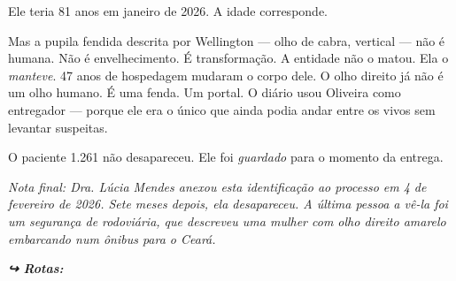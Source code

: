 \noindent Ele teria 81 anos em janeiro de 2026. A idade corresponde.

\noindent Mas a pupila fendida descrita por Wellington --- olho de cabra, vertical --- não é humana. Não é envelhecimento. É transformação. A entidade não o matou. Ela o \textit{manteve}. 47 anos de hospedagem mudaram o corpo dele. O olho direito já não é um olho humano. É uma fenda. Um portal. O diário usou Oliveira como entregador --- porque ele era o único que ainda podia andar entre os vivos sem levantar suspeitas.

\noindent O paciente 1.261 não desapareceu. Ele foi \textit{guardado} para o momento da entrega.

\noindent \textit{Nota final: Dra. Lúcia Mendes anexou esta identificação ao processo em 4 de fevereiro de 2026. Sete meses depois, ela desapareceu. A última pessoa a vê-la foi um segurança de rodoviária, que descreveu uma mulher com olho direito amarelo embarcando num ônibus para o Ceará.}

\vspace{0.5em}
\noindent\textit{\textbf{↪ Rotas:}  \rotasep {} \rotasep {}}

